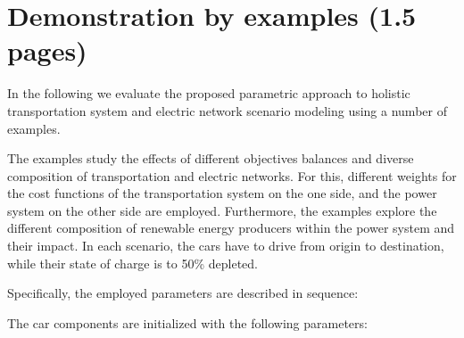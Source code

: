 \section{Demonstration by examples (1.5 pages)}
\label{section:evaluation}

In the following we evaluate the proposed parametric approach to holistic transportation system and electric network scenario modeling using a number of examples. 

The examples study the effects of different objectives balances and diverse composition of transportation and electric networks. For this, different weights for the cost functions of the transportation system on the one side, and the power system on the other side are employed. Furthermore, the examples explore the different composition of renewable energy producers within the power system and their impact. In each scenario, the cars have to drive from origin to destination, while their state of charge is to 50\% depleted.

Specifically, the employed parameters are described in sequence:

The car components are initialized with the following parameters:


